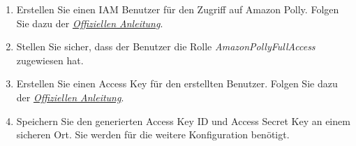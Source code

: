 \begin{enumerate}
    \begin{enumerate}
        \item Erstellen Sie einen IAM Benutzer für den Zugriff auf Amazon Polly. Folgen Sie dazu der \href{https://aws.amazon.com/premiumsupport/knowledge-center/create-access-key/}{\textit{Offiziellen Anleitung}}.
        \item Stellen Sie sicher, dass der Benutzer die Rolle \textit{AmazonPollyFullAccess} zugewiesen hat.
        \item Erstellen Sie einen Access Key für den erstellten Benutzer. Folgen Sie dazu der \href{https://aws.amazon.com/premiumsupport/knowledge-center/create-access-key/}{\textit{Offiziellen Anleitung}}.
        \item Speichern Sie den generierten Access Key ID und Access Secret Key an einem sicheren Ort. Sie werden für die weitere Konfiguration benötigt.
    \end{enumerate}


\end{enumerate}
